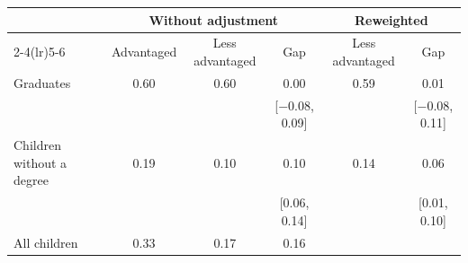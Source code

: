 \begin{tabular}{@{}lccccc@{}}
\toprule
 & \multicolumn{3}{c}{Without adjustment} & \multicolumn{2}{c}{Reweighted} \\
\cmidrule(lr){2-4}\cmidrule(lr){5-6}
 & Advantaged & Less advantaged & Gap & Less advantaged & Gap \\
\midrule
Graduates & 0.60 & 0.60 & 0.00 & 0.59 & 0.01 \\
 & & & [$-$0.08, 0.09] & & [$-$0.08, 0.11] \\
Children without a degree & 0.19 & 0.10 & 0.10 & 0.14 & 0.06 \\
 & & & [0.06, 0.14] & & [0.01, 0.10] \\
All children & 0.33 & 0.17 & 0.16 & & \\
\bottomrule
\end{tabular}
